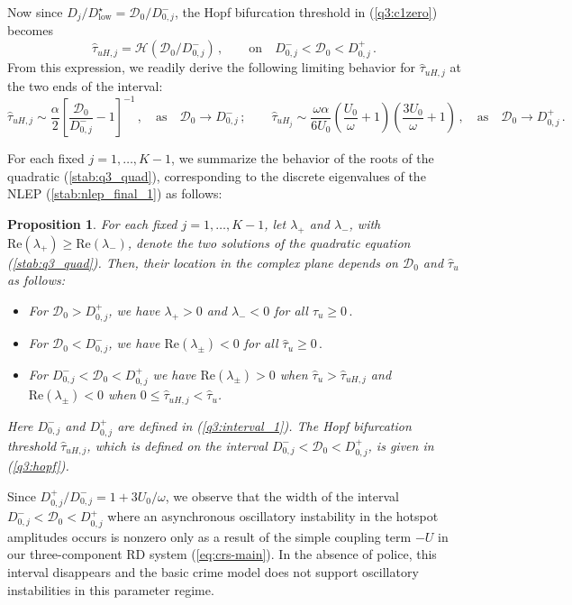 \documentclass{article}%
\newtheorem{prop}[theorem]{Proposition}
\newcommand{\dzjp}{D^{+}_{0,j}}
\newcommand{\dzjm}{D^{-}_{0,j}}
\newcommand{\dlstar}{D_{\textrm{low}}^{\star}}
\begin{document}
Now since ${D_j/\dlstar}={{\mathcal D}_0/\dzjm}$, the Hopf bifurcation
threshold in (\ref{q3:c1zero}) becomes
\begin{equation}\label{q3:hopf}
   \hat{\tau}_{uH,j} = {\mathcal H}\left({{\mathcal D}_0/\dzjm}\right)
   \,, \qquad \mbox{on} \quad  \dzjm < {\mathcal D}_0 <\dzjp \,.
\end{equation}
From this expression, we readily derive the following limiting
behavior for $\hat{\tau}_{uH,j}$ at the two ends of the interval:
\begin{equation}\label{q3:tau_lim}
 \hat{\tau}_{uH,j} \sim \frac{\alpha}{2} \left[ \frac{{\mathcal D}_0}
 {D^{-}_{0,j}}-1 \right]^{-1} \,, \quad \mbox{as} \quad
{\mathcal D}_0\to \dzjm\,; \qquad
 \hat{\tau}_{uH_j}\sim \frac{\omega \alpha}{6 U_0} \left( \frac{U_0}{\omega}
  + 1 \right) \left( \frac{3U_0}{\omega} + 1\right) \,, \quad \mbox{as}
  \quad {\mathcal D}_0\to \dzjp \,.
\end{equation}

For each fixed $j=1,\ldots,K-1$, we summarize the behavior of the roots
of the quadratic (\ref{stab:q3_quad}), corresponding to the discrete
eigenvalues of the NLEP (\ref{stab:nlep_final_1}) as follows:

\begin{prop}\label{q3:roots_quad} For each fixed $j=1,\ldots,K-1$,
let $\lambda_{+}$ and $\lambda_{-}$, with
$\mbox{Re}(\lambda_{+})\geq\mbox{Re}(\lambda_{-})$, denote the two
solutions of the quadratic equation (\ref{stab:q3_quad}). Then, their
location in the complex plane depends on ${\mathcal D}_0$ and
$\hat{\tau}_u$ as follows:
\begin{itemize}
  \item For ${\mathcal D}_0>\dzjp$, we have $\lambda_+>0$ and $\lambda_-<0$
     for all $\hat{\tau}_u\geq 0 \,.$
  \item For ${\mathcal D}_0<\dzjm$, we have $\mbox{Re}(\lambda_{\pm})<0$
     for all $\hat{\tau}_u\geq 0 \,.$
  \item For $\dzjm<{\mathcal D}_0<\dzjp$ we have $\mbox{Re}(\lambda_{\pm})>0$
   when $\hat{\tau}_u>\hat{\tau}_{uH,j}$ and $\mbox{Re}(\lambda_{\pm})<0$ when
   $0\leq \hat{\tau}_{uH,j}<\hat{\tau}_u$.
\end{itemize}
Here $\dzjm$ and $\dzjp$ are defined in (\ref{q3:interval_1}). The
Hopf bifurcation threshold $\hat{\tau}_{uH,j}$, which is defined on
the interval $\dzjm < {\mathcal D}_0 <\dzjp$, is given in
(\ref{q3:hopf}).
\end{prop}

Since ${\dzjp/\dzjm}=1+{3U_0/\omega}$, we observe that the width of
the interval $\dzjm<{\mathcal D}_0<\dzjp$ where an asynchronous
oscillatory instability in the hotspot amplitudes occurs is nonzero only as
a result of the simple coupling term $-U$ in our three-component RD
system (\ref{eq:crs-main}). In the absence of police, this interval
disappears and the basic crime model does not support oscillatory
instabilities in this parameter regime.
\end{document}
